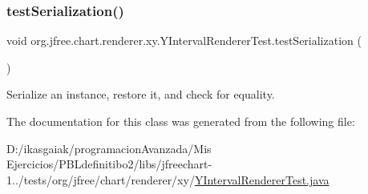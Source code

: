 \subsubsection{\texorpdfstring{test\+Serialization()}{testSerialization()}}
{\footnotesize\ttfamily void org.\+jfree.\+chart.\+renderer.\+xy.\+Y\+Interval\+Renderer\+Test.\+test\+Serialization (\begin{DoxyParamCaption}{ }\end{DoxyParamCaption})}

Serialize an instance, restore it, and check for equality. 

The documentation for this class was generated from the following file\+:\begin{DoxyCompactItemize}
\item 
D\+:/ikasgaiak/programacion\+Avanzada/\+Mis Ejercicios/\+P\+B\+Ldefinitibo2/libs/jfreechart-\/1../tests/org/jfree/chart/renderer/xy/\mbox{\hyperlink{_y_interval_renderer_test_8java}{Y\+Interval\+Renderer\+Test.\+java}}\end{DoxyCompactItemize}

